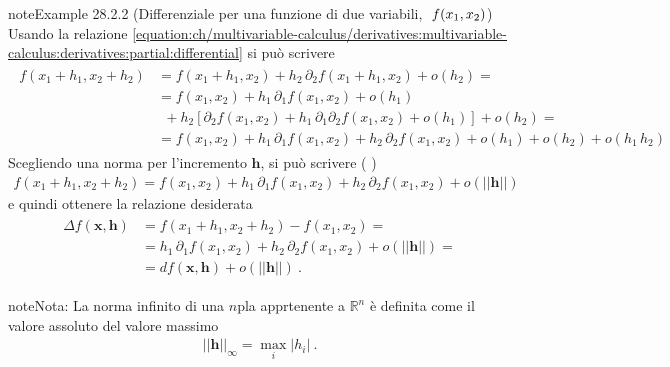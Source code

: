 \documentclass[letterpaper,10pt,italian]{jupyterBook}
\begin{document}
\begin{sphinxadmonition}{note}{Example 28.2.2 (Differenziale per una funzione di due variabili, \protect\(\ f(x_1, x_2) \protect\))}
\sphinxAtStartPar
Usando la relazione \eqref{equation:ch/multivariable-calculus/derivatives:multivariable-calculus:derivatives:partial:differential} si può scrivere
\begin{equation*}
\begin{split}\begin{aligned}
f(x_1 + h_1, x_2 + h_2)
  & = f(x_1 + h_1, x_2 ) + h_2 \, \partial_{2} f(x_1 + h_1, x_2) + o(h_2) = \\
  & = f(x_1, x_2) + h_1 \, \partial_{1} f(x_1, x_2) + o(h_1) \\
  & \ \ + h_2 \left[ \partial_{2} f(x_1, x_2) + h_1 \, \partial_{1}\partial_{2} f(x_1, x_2) + o (h_1) \right] + o(h_2) = \\
  & = f(x_1, x_2) + h_1 \, \partial_{1} f(x_1, x_2) + h_2 \, \partial_{2} f(x_1, x_2) + o(h_1) + o(h_2) + o(h_1 \, h_2) 
\end{aligned}\end{split}
\end{equation*}
\sphinxAtStartPar
Scegliendo una norma per l’incremento \(\mathbf{h}\), si può scrivere ( )
\begin{equation*}
\begin{split}
f(x_1 + h_1, x_2 + h_2) = f(x_1, x_2) + h_1 \, \partial_{1} f(x_1, x_2) + h_2 \, \partial_{2} f(x_1, x_2) + o(||\mathbf{h}||)
\end{split}
\end{equation*}
\sphinxAtStartPar
e quindi ottenere la relazione desiderata
\begin{equation*}
\begin{split}\begin{aligned}
\Delta f(\mathbf{x}, \mathbf{h}) & = f(x_1 + h_1, x_2 + h_2) - f(x_1, x_2) = \\
                                 & = h_1 \, \partial_{1} f(x_1, x_2) + h_2 \, \partial_{2} f(x_1, x_2) + o(||\mathbf{h}||) = \\
                                 & = d f(\mathbf{x}, \mathbf{h}) + o(||\mathbf{h}||) \ .
\end{aligned}\end{split}
\end{equation*}\end{sphinxadmonition}

\begin{sphinxadmonition}{note}{Nota:}
\sphinxAtStartPar
{}
La norma infinito di una \(n\)\sphinxhyphen{}pla apprtenente a \(\mathbb{R}^n\) è definita come il valore assoluto del valore massimo
\begin{equation*}
\begin{split}||\mathbf{h}||_{\infty} = \max_i |h_i| \ .\end{split}
\end{equation*}\end{sphinxadmonition}
\end{document}
